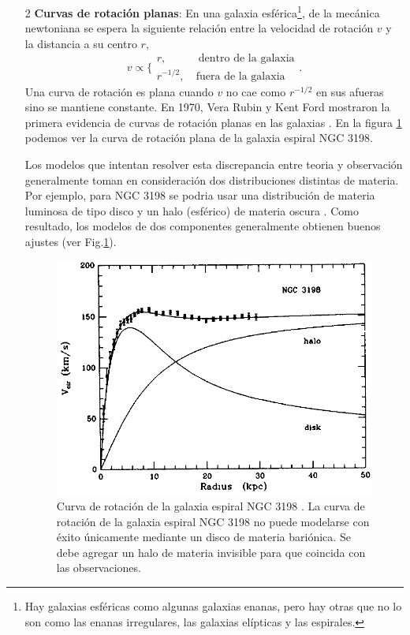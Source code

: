 \begin{itemize}

\item[2] \textbf{Curvas de rotación planas}: En una galaxia esférica\footnote{Hay galaxias esféricas como algunas galaxias enanas, pero hay otras que no lo son como las enanas irregulares, las galaxias elípticas y las espirales.}, de la mecánica newtoniana se espera la siguiente relación entre la velocidad de rotación $v$ y la distancia a su centro $r$,
\begin{equation}
v \propto \bigg\lbrace
\begin{array}{cc} 
r,&~\text{dentro de la galaxia} \\ 
r^{-1/2},~ &\text{fuera de la galaxia} 
\end{array}.
\label{vr-relation}
\end{equation}
Una curva de rotación es plana cuando $v$ no cae como $r^{-1/2}$ en sus afueras sino se mantiene constante. En 1970, Vera Rubin y Kent Ford mostraron la primera evidencia de curvas de rotación planas en las galaxias \cite{Vera}. En la figura \ref{rotationcurve} podemos ver la curva de rotación plana de la galaxia espiral NGC 3198.

Los modelos que intentan resolver esta discrepancia entre teoria y observación generalmente toman en consideración dos distribuciones distintas de materia. Por ejemplo, para NGC 3198 se podria usar una distribución de materia luminosa de tipo disco y un halo (esférico) de materia oscura \cite{van2004distribution}. Como resultado, los modelos de dos componentes generalmente obtienen buenos ajustes (ver Fig.\ref{rotationcurve}).

\begin{figure}[h!]
\centering
  \includegraphics[width=.8\linewidth]{Images/NGC3198.png}
  \caption[Curva de rotación de la galaxia espiral NGC 3198]{Curva de rotación de la galaxia espiral NGC 3198 \cite{van2004distribution}. La curva de rotación de la galaxia espiral NGC 3198 no puede modelarse con éxito únicamente mediante un disco de materia bariónica. Se debe agregar un halo de materia invisible para que coincida con las observaciones.}
  \label{rotationcurve}
\end{figure}



\end{itemize}
